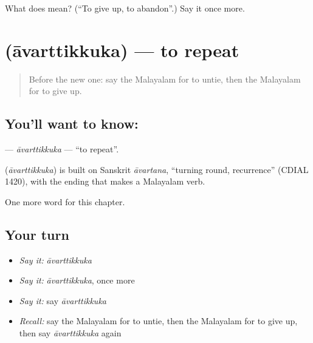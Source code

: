 \begin{tcolorbox}[breakable,colback=teal!4,colframe=teal!35!black,title={Before you move on}]
What does  mean? (\textquotedblleft{}To give up, to abandon\textquotedblright{}.) Say it once more.
\end{tcolorbox}
\section[\texorpdfstring{\ml{ആവർത്തിക്കുക} (āvarttikkuka)}{ആവർത്തിക്കുക (āvarttikkuka)}]{ (āvarttikkuka) — to repeat}

\label{lesson:ML-C310-avarttikkuka}



\begin{quote}
Before the new one: say the Malayalam for to untie, then the Malayalam for to give up.
\end{quote}

\subsection*{You'll want to know: }
\textbf{} — \emph{āvarttikkuka} — \textquotedblleft{}to repeat\textquotedblright{}.

\begin{cousinweb}
\textbf{} (\emph{āvarttikkuka}) is built on Sanskrit \emph{āvartana}, \textquotedblleft{}turning round, recurrence\textquotedblright{} (CDIAL 1420), with the ending that makes a Malayalam verb.
\end{cousinweb}

\begin{grammarlens}[title={What you've built}]
One more word for this chapter.
\end{grammarlens}

\subsection*{Your turn}
\begin{itemize}
\raggedright
  \item \emph{Say it:} \emph{āvarttikkuka}
  \item \emph{Say it:} \emph{āvarttikkuka}, once more
  \item \emph{Say it:} say \emph{āvarttikkuka}
  \item \emph{Recall:} say the Malayalam for to untie, then the Malayalam for to give up, then say \emph{āvarttikkuka} again
\end{itemize}

